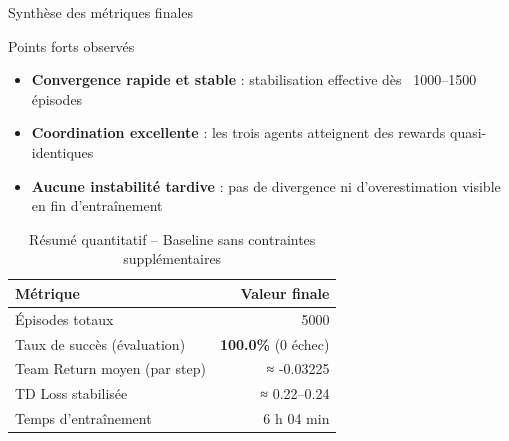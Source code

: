 \documentclass[aspectratio=169]{beamer}
\begin{document}
\begin{frame}{Synthèse des métriques finales}

    \begin{block}{Points forts observés}
    \begin{itemize}
        \item \textbf{Convergence rapide et stable} : stabilisation effective dès ~1000–1500 épisodes
        \item \textbf{Coordination excellente} : les trois agents atteignent des rewards quasi-identiques
        \item \textbf{Aucune instabilité tardive} : pas de divergence ni d'overestimation visible en fin d'entraînement
    \end{itemize}
    \end{block}
    
    \begin{table}[]
        \footnotesize\centering
        \renewcommand{\arraystretch}{1.3}
        \begin{tabular}{lr}
        \toprule
        Métrique                              & Valeur finale                  \\
        \midrule
        Épisodes totaux                       & 5000                           \\
        Taux de succès (évaluation)           & \textbf{100.0\%} (0 échec)     \\
        Team Return moyen (par step) & ≈ -0.03225                     \\
        TD Loss stabilisée                    & ≈ 0.22–0.24                    \\
        Temps d'entraînement                  & 6 h 04 min                     \\
        \bottomrule
        \end{tabular}
        \caption{Résumé quantitatif – Baseline sans contraintes supplémentaires}
    \end{table}
    
\end{frame}

\end{document}
